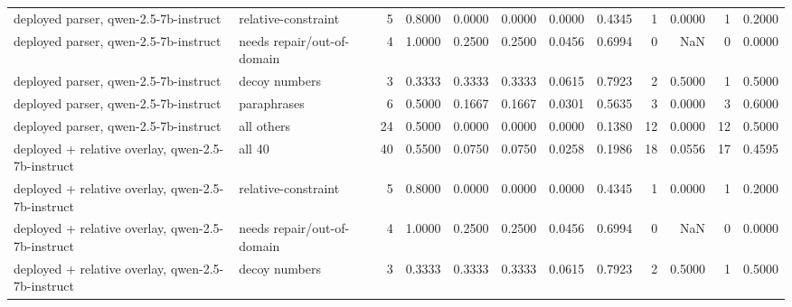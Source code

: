 \begin{tabular}{llrrrrrrrrrr}
            deployed parser, qwen-2.5-7b-instruct &        relative-constraint &  5 &         0.8000 &      0.0000 &        0.0000 &          0.0000 &          0.4345 &           1 &                       0.0000 &                   1 &                                  0.2000 \\
            deployed parser, qwen-2.5-7b-instruct & needs repair/out-of-domain &  4 &         1.0000 &      0.2500 &        0.2500 &          0.0456 &          0.6994 &           0 &                          NaN &                   0 &                                  0.0000 \\
            deployed parser, qwen-2.5-7b-instruct &              decoy numbers &  3 &         0.3333 &      0.3333 &        0.3333 &          0.0615 &          0.7923 &           2 &                       0.5000 &                   1 &                                  0.5000 \\
            deployed parser, qwen-2.5-7b-instruct &                paraphrases &  6 &         0.5000 &      0.1667 &        0.1667 &          0.0301 &          0.5635 &           3 &                       0.0000 &                   3 &                                  0.6000 \\
            deployed parser, qwen-2.5-7b-instruct &                 all others & 24 &         0.5000 &      0.0000 &        0.0000 &          0.0000 &          0.1380 &          12 &                       0.0000 &                  12 &                                  0.5000 \\
deployed + relative overlay, qwen-2.5-7b-instruct &                     all 40 & 40 &         0.5500 &      0.0750 &        0.0750 &          0.0258 &          0.1986 &          18 &                       0.0556 &                  17 &                                  0.4595 \\
deployed + relative overlay, qwen-2.5-7b-instruct &        relative-constraint &  5 &         0.8000 &      0.0000 &        0.0000 &          0.0000 &          0.4345 &           1 &                       0.0000 &                   1 &                                  0.2000 \\
deployed + relative overlay, qwen-2.5-7b-instruct & needs repair/out-of-domain &  4 &         1.0000 &      0.2500 &        0.2500 &          0.0456 &          0.6994 &           0 &                          NaN &                   0 &                                  0.0000 \\
deployed + relative overlay, qwen-2.5-7b-instruct &              decoy numbers &  3 &         0.3333 &      0.3333 &        0.3333 &          0.0615 &          0.7923 &           2 &                       0.5000 &                   1 &                                  0.5000 \\

\end{tabular}
